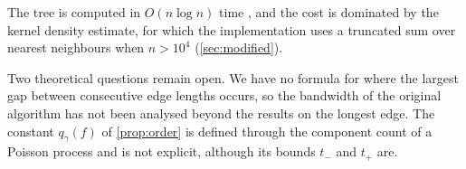 The tree is computed in $O(n\log n)$ time \citep{March2010}, and the cost is dominated by the kernel density estimate, for which the implementation uses a truncated sum over nearest neighbours when $n>10^4$ (\cref{sec:modified}).

Two theoretical questions remain open. We have no formula for where the largest gap between consecutive edge lengths occurs, so the bandwidth of the original algorithm has not been analysed beyond the results on the longest edge. The constant $q_\gamma(f)$ of \cref{prop:order} is defined through the component count of a Poisson process and is not explicit, although its bounds $t_-$ and $t_+$ are.
